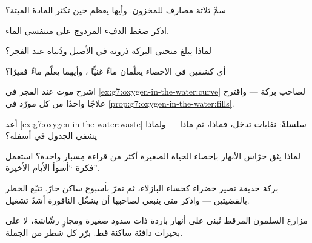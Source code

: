 \begin{exercise}[$\star$]\label{exo:g7:oxygen-in-the-water:3}
سمِّ ثلاثة مصارف للمخزون. وأيها يعظم حين تكثر المادة الميتة؟
\end{exercise}

\begin{exercise}[$\star$]\label{exo:g7:oxygen-in-the-water:4}
اذكر ضغط الدفء المزدوج على متنفسي الماء.
\end{exercise}

\begin{exercise}[$\star$]\label{exo:g7:oxygen-in-the-water:5}
لماذا يبلغ منحنى  البركة ذروته في الأصيل ودُنياه عند الفجر؟
\end{exercise}

\begin{exercise}[$\star$]\label{exo:g7:oxygen-in-the-water:6}
أي كشفين في الإحصاء يعلّمان ماءً غنيًّا ، وأيهما يعلّم
ماءً فقيرًا؟
\end{exercise}

\begin{exercise}[$\star\star$]\label{exo:g7:oxygen-in-the-water:7}
اشرح موت  عند الفجر في
\cref{ex:g7:oxygen-in-the-water:curve} لصاحب بركة --- واقترح علاجًا
واحدًا من كل مورّد في
\cref{prop:g7:oxygen-in-the-water:fills}.
\end{exercise}

\begin{exercise}[$\star\star$]\label{exo:g7:oxygen-in-the-water:8}
أعد \cref{ex:g7:oxygen-in-the-water:waste} سلسلةً: نفايات تدخل،
فماذا، ثم ماذا --- ولماذا يشفى الجدول في أسفله؟
\end{exercise}

\begin{exercise}[$\star\star$]\label{exo:g7:oxygen-in-the-water:9}
لماذا يثق حرّاس الأنهار بإحصاء الحياة الصغيرة أكثر من قراءة مِسبار
واحدة؟ استعمل فكرة ``أسوأ الأيام الأخيرة''.
\end{exercise}

\begin{exercise}[$\star\star$]\label{exo:g7:oxygen-in-the-water:10}
بركة حديقة تصير خضراء كحساء البازلاء، ثم تمرّ بأسبوع ساكن حارّ.
تتبّع الخطر بالقضيتين --- واذكر متى ينبغي لصاحبها أن يشغّل النافورة
أشدّ تشغيل.
\end{exercise}

\begin{exercise}[$\star\star$]\label{exo:g7:oxygen-in-the-water:11}
مزارع السلمون المرقط تُبنى على أنهار باردة ذات سدود صغيرة ومجارٍ
رشّاشة، لا على بحيرات دافئة ساكنة قط. برّر كل شطر من الجملة.
\end{exercise}

